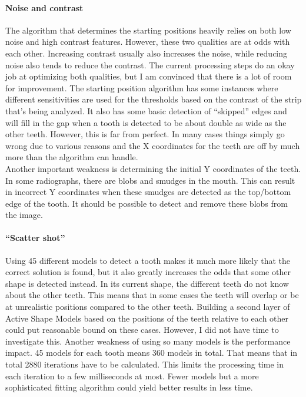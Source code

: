 \documentclass[a4paper,10pt]{article}
\begin{document}
\paragraph{Noise and contrast} The algorithm that determines the starting positions heavily relies on both low noise and high contrast features. However, these two qualities are at odds with each other. Increasing contrast usually also increases the noise, while reducing noise also tends to reduce the contrast. The current processing steps do an okay job at optimizing both qualities, but I am convinced that there is a lot of room for improvement. The starting position algorithm has some instances where different sensitivities are used for the thresholds based on the contrast of the strip that's being analyzed. It also has some basic detection of ``skipped'' edges and will fill in the gap when a tooth is detected to be about double as wide as the other teeth. However, this is far from perfect. In many cases things simply go wrong due to various reasons and the X coordinates for the teeth are off by much more than the algorithm can handle.
\\
Another important weakness is determining the initial Y coordinates of the teeth. In some radiographs, there are blobs and smudges in the mouth. This can result in incorrect Y coordinates when these smudges are detected as the top/bottom edge of the tooth. It should be possible to detect and remove these blobs from the image.

\paragraph{``Scatter shot''} Using 45 different models to detect a tooth makes it much more likely that the correct solution is found, but it also greatly increases the odds that some other shape is detected instead. In its current shape, the different teeth do not know about the other teeth. This means that in some cases the teeth will overlap or be at unrealistic positions compared to the other teeth. Building a second layer of Active Shape Models based on the positions of the teeth relative to each other could put reasonable bound on these cases. However, I did not have time to investigate this. Another weakness of using so many models is the performance impact. 45 models for each tooth means 360 models in total. That means that in total 2880 iterations have to be calculated. This limits the processing time in each iteration to a few milliseconds at most. Fewer models but a more sophisticated fitting algorithm could yield better results in less time.
\end{document}
